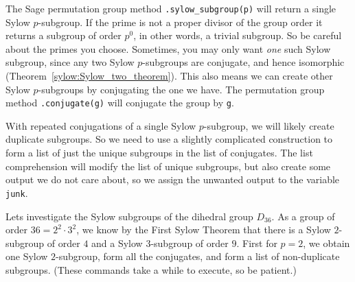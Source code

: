 %
The Sage permutation group method \verb?.sylow_subgroup(p)? will return a single Sylow $p$-subgroup.  If the prime is not a proper divisor of the group order it returns a subgroup of order $p^0$, in other words, a trivial subgroup.  So be careful about the primes you choose.  Sometimes, you may only want \emph{one} such Sylow subgroup, since any two Sylow $p$-subgroups are conjugate, and hence isomorphic (Theorem~\ref{sylow:Sylow_two_theorem}).  This also means we can create other Sylow $p$-subgroups by conjugating the one we have.  The permutation group method \verb?.conjugate(g)? will conjugate the group by \verb?g?.\par
%
With repeated conjugations of a single Sylow $p$-subgroup, we will likely create duplicate subgroups.  So we need to use a slightly complicated construction to form a list of just the unique subgroups in the list of conjugates.  The list comprehension will modify the list of unique subgroups, but also create some output we do not care about, so we assign the unwanted output to the variable \verb?junk?.\par
%
Lets investigate the Sylow subgroups of the dihedral group $D_{36}$.  As a group of order $36=2^2\cdot 3^2$, we know by the First Sylow Theorem that there is a Sylow $2$-subgroup of order $4$ and a Sylow $3$-subgroup of order $9$.  First for $p=2$, we obtain one Sylow $2$-subgroup, form all the conjugates, and form a list of non-duplicate subgroups.  (These commands take a while to execute, so be patient.)
%
